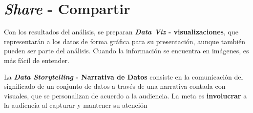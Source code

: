
\section{\textit{Share} - Compartir}
Con los resultados del análisis, se preparan \textbf{\textit{Data Viz} - visualizaciones}, que representarán a los datos de forma gráfica para su presentación, aunque también pueden ser parte del análisis. Cuando la información se encuentra en imágenes, es más fácil de entender. 

La \textbf{\textit{Data Storytelling} - Narrativa de Datos} consiste en la comunicación del significado de un conjunto de datos a través de una narrativa contada con visuales, que se personalizan de acuerdo a la audiencia. La meta es \textbf{involucrar} a la audiencia al capturar y mantener su atención

